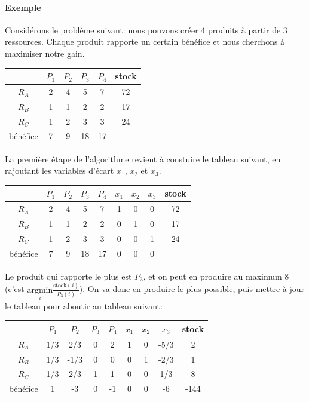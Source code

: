     \paragraph{Exemple}
      Considérons le problème suivant: nous pouvons créer 4 produits à partir
      de 3 ressources. Chaque produit rapporte un certain bénéfice et nous
      cherchons à maximiser notre gain.  
      \begin{center}
        \begin{tabular}{|c|cccc|c|}\hline
          & $P_1$ & $P_2$ & $P_3$ & $P_4$ & stock \\ \hline
          $R_A$ & 2 & 4 & 5 & 7 & 72 \\
          $R_B$ & 1 & 1 & 2 & 2 & 17 \\
          $R_C$ & 1 & 2 & 3 & 3 & 24 \\ \hline
          bénéfice & 7 & 9 & 18 & 17 &  \\ \hline
        \end{tabular}
      \end{center}

      La première étape de l'algorithme revient à constuire le tableau suivant,
      en rajoutant les variables d'écart $x_1$, $x_2$ et $x_3$.

      \begin{center}
        \begin{tabular}{|c|ccccccc|c|}\hline
          & $P_1$ & $P_2$ & $P_3$ & $P_4$ & $x_1$ & $x_2$ & $x_3$ & stock \\ \hline
          $R_A$ & 2 & 4 & 5 & 7 & 1 & 0 & 0 & 72 \\
          $R_B$ & 1 & 1 & 2 & 2 & 0 & 1 & 0 & 17 \\
          $R_C$ & 1 & 2 & 3 & 3 & 0 & 0 & 1 & 24 \\ \hline
          bénéfice & 7 & 9 & 18 & 17 & 0 & 0 & 0 & \\ \hline
        \end{tabular}
      \end{center}

      Le produit qui rapporte le plus est $P_3$, et on peut en produire au
      maximum 8 (c'est $\underset{i}{\text{argmin}}
      \frac{\text{stock}(i)}{P_3(i)}$). On va donc en produire le plus
      possible, puis mettre à jour le tableau pour aboutir au tableau suivant:

      \begin{center}
        \begin{tabular}{|c|ccccccc|c|}\hline
          & $P_1$ & $P_2$ & $P_3$ & $P_4$ & $x_1$ & $x_2$ & $x_3$ & stock \\ \hline
          $R_A$ & 1/3 & 2/3 & 0 & 2 & 1 & 0 & -5/3 & 2 \\
          $R_B$ & 1/3 & -1/3 & 0 & 0 & 0 & 1 & -2/3 & 1 \\
          $R_C$ & 1/3 & 2/3 & 1 & 1 & 0 & 0 & 1/3 & 8 \\ \hline
          bénéfice & 1 & -3 & 0 & -1 & 0 & 0 & -6 & -144 \\ \hline
        \end{tabular}
      \end{center}


